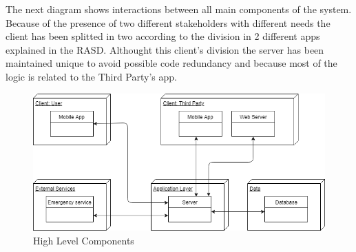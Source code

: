 The next diagram shows interactions between all main components of the system. Because of the presence of two different stakeholders with different needs the client has been splitted in two according to the division in 2 different apps explained in the RASD. Althought this client's division the server has been maintained unique to avoid possible code redundancy and because most of the logic is related to the Third Party's app.

\begin{figure}[h!]
	\includegraphics[width=1.0\textwidth]{./pictures/high_level_diagram.png}\par
	\caption{High Level Components}
\end{figure}
\FloatBarrier